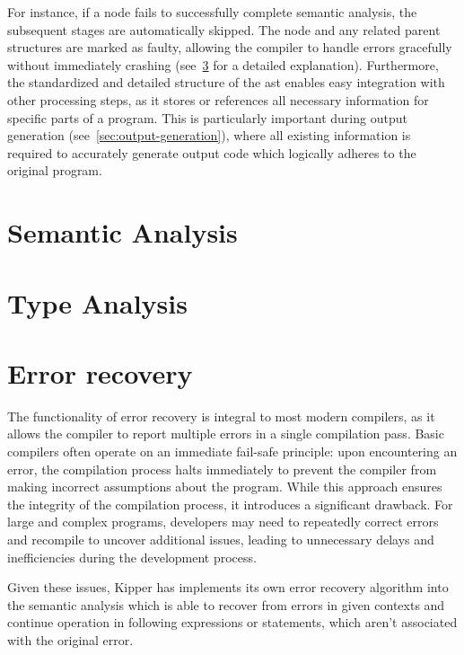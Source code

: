 For instance, if a node fails to successfully complete semantic analysis, the subsequent stages are automatically skipped. The node and any related parent structures are marked as faulty, allowing the compiler to handle errors gracefully without immediately crashing (see~\ref{sec:error-recovery} for a detailed explanation). Furthermore, the standardized and detailed structure of the \acrshort{ast} enables easy integration with other processing steps, as it stores or references all necessary information for specific parts of a program. This is particularly important during output generation (see~\ref{sec:output-generation}), where all existing information is required to accurately generate output code which logically adheres to the original program.

\section{Semantic Analysis}
\label{sec:semantic-analysis}

\section{Type Analysis}
\label{sec:type-analysis}

\section{Error recovery}
\label{sec:error-recovery}

The functionality of error recovery is integral to most modern compilers, as it allows the compiler to report multiple errors in a single compilation pass. Basic compilers often operate on an immediate fail-safe principle: upon encountering an error, the compilation process halts immediately to prevent the compiler from making incorrect assumptions about the program. While this approach ensures the integrity of the compilation process, it introduces a significant drawback. For large and complex programs, developers may need to repeatedly correct errors and recompile to uncover additional issues, leading to unnecessary delays and inefficiencies during the development process.

Given these issues, Kipper has implements its own error recovery algorithm into the semantic analysis which is able to recover from errors in given contexts and continue operation in following expressions or statements, which aren't associated with the original error.


